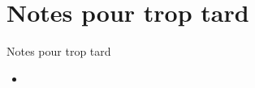 \documentclass{beamer}
\begin{document}
\section{Notes pour trop tard}
	\begin{frame}{Notes pour trop tard}
		\begin{itemize}
			\item %
		\end{itemize}
	\end{frame}
\end{document}
